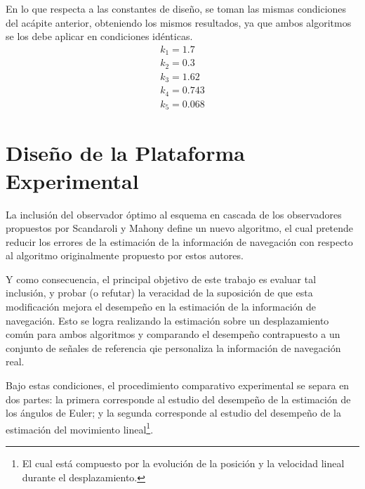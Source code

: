 \documentclass[10pt]{report}
\numberwithin{equation}{chapter}
\numberwithin{algorithm}{chapter}
\begin{document}
En lo que respecta a las constantes de diseño, se toman las mismas condiciones del acápite anterior, obteniendo los mismos resultados, ya que ambos algoritmos se los debe aplicar en condiciones idénticas.
\begin{gather*}
k_1=1.7\\
k_2=0.3\\
k_3=1.62\\
k_4=0.743\\
k_5=0.068
\end{gather*}
\section{Diseño de la Plataforma Experimental}\label{Plataforma}
La inclusión del observador óptimo al esquema en cascada de los observadores propuestos por Scandaroli y Mahony define un nuevo algoritmo, el cual pretende reducir los errores de la estimación de la información de navegación con respecto al algoritmo originalmente propuesto por estos autores.\par
Y como consecuencia, el principal objetivo de este trabajo es evaluar tal inclusión, y probar (o refutar) la veracidad de la suposición de que esta modificación mejora el desempeño en la estimación de la información de navegación. Esto se logra realizando la estimación sobre un desplazamiento común para ambos algoritmos y comparando el desempeño contrapuesto a un conjunto de señales de referencia qie personaliza la información de navegación real.\par
Bajo estas condiciones, el procedimiento comparativo experimental se separa en dos partes: la primera corresponde al estudio del desempeño de la estimación de los ángulos de Euler; y la segunda corresponde al estudio del desempeño de la estimación del movimiento lineal\footnote{El cual está compuesto por la evolución de la posición y la velocidad lineal durante el desplazamiento.}.
\end{document}
